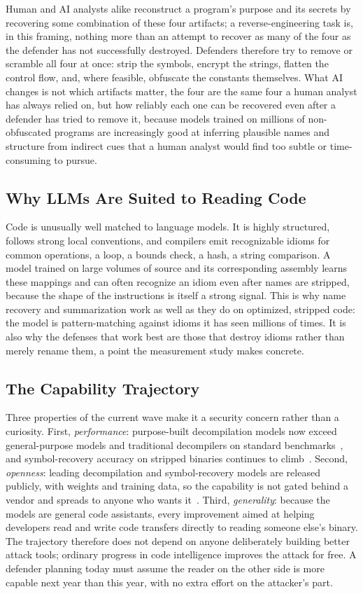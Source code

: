 \documentclass[conference]{IEEEtran}
\begin{document}
Human and AI analysts alike reconstruct a program's purpose and its secrets by
recovering some combination of these four artifacts; a reverse-engineering task
is, in this framing, nothing more than an attempt to recover as many of the four
as the defender has not successfully destroyed. Defenders therefore try to remove
or scramble all four at once: strip the symbols, encrypt the strings, flatten the
control flow, and, where feasible, obfuscate the constants themselves. What AI
changes is not which artifacts matter, the four are the same four a human analyst
has always relied on, but how reliably each one can be recovered even after a
defender has tried to remove it, because models trained on millions of
non-obfuscated programs are increasingly good at inferring plausible names and
structure from indirect cues that a human analyst would find too subtle or
time-consuming to pursue.

\subsection{Why LLMs Are Suited to Reading Code}
Code is unusually well matched to language models. It is highly structured, follows
strong local conventions, and compilers emit recognizable idioms for common
operations, a loop, a bounds check, a hash, a string comparison. A model trained on
large volumes of source and its corresponding assembly learns these mappings and
can often recognize an idiom even after names are stripped, because the shape of the
instructions is itself a strong signal. This is why name recovery and summarization
work as well as they do on optimized, stripped code: the model is pattern-matching
against idioms it has seen millions of times. It is also why the defenses that work
best are those that destroy idioms rather than merely rename them, a point the
measurement study makes concrete.

\subsection{The Capability Trajectory}
Three properties of the current wave make it a security concern rather than a
curiosity. First, \emph{performance}: purpose-built decompilation models now exceed
general-purpose models and traditional decompilers on standard
benchmarks~\cite{llm4decompile}, and symbol-recovery accuracy on stripped binaries
continues to climb~\cite{gennm,funcname,howfar}. Second, \emph{openness}: leading
decompilation and symbol-recovery models are released publicly, with weights and
training data, so the capability is not gated behind a vendor and spreads to anyone
who wants it~\cite{llm4decompile,resym}. Third, \emph{generality}: because the
models are general code assistants, every improvement aimed at helping developers
read and write code transfers directly to reading someone else's binary. The
trajectory therefore does not depend on anyone deliberately building better attack
tools; ordinary progress in code intelligence improves the attack for free. A
defender planning today must assume the reader on the other side is more capable
next year than this year, with no extra effort on the attacker's part.
\end{document}
